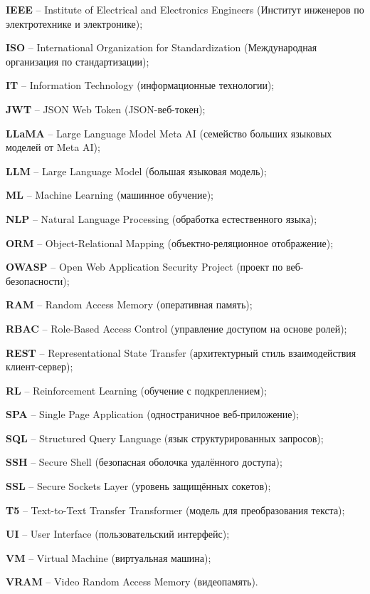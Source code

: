 \par \textbf{IEEE} – Institute of Electrical and Electronics Engineers (Институт инженеров по электротехнике и электронике);
\par \textbf{ISO} – International Organization for Standardization (Международная организация по стандартизации);
\par \textbf{IT} – Information Technology (информационные технологии);
\par \textbf{JWT} – JSON Web Token (JSON-веб-токен);
\par \textbf{LLaMA} – Large Language Model Meta AI (семейство больших языковых моделей от Meta AI);
\par \textbf{LLM} – Large Language Model (большая языковая модель);
\par \textbf{ML} – Machine Learning (машинное обучение);
\par \textbf{NLP} – Natural Language Processing (обработка естественного языка);
\par \textbf{ORM} – Object-Relational Mapping (объектно-реляционное отображение);
\par \textbf{OWASP} – Open Web Application Security Project (проект по веб-безопасности);
\par \textbf{RAM} – Random Access Memory (оперативная память);
\par \textbf{RBAC} – Role-Based Access Control (управление доступом на основе ролей);
\par \textbf{REST} – Representational State Transfer (архитектурный стиль взаимодействия клиент-сервер);
\par \textbf{RL} – Reinforcement Learning (обучение с подкреплением);
\par \textbf{SPA} – Single Page Application (одностраничное веб-приложение);
\par \textbf{SQL} – Structured Query Language (язык структурированных запросов);
\par \textbf{SSH} – Secure Shell (безопасная оболочка удалённого доступа);
\par \textbf{SSL} – Secure Sockets Layer (уровень защищённых сокетов);
\par \textbf{T5} – Text-to-Text Transfer Transformer (модель для преобразования текста);
\par \textbf{UI} – User Interface (пользовательский интерфейс);
\par \textbf{VM} – Virtual Machine (виртуальная машина);
\par \textbf{VRAM} – Video Random Access Memory (видеопамять).

